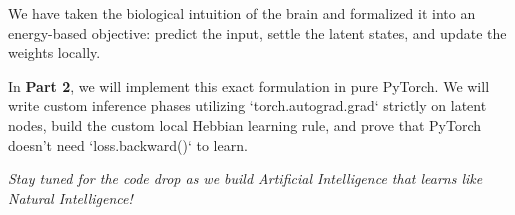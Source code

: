 \documentclass[12pt]{article}
\begin{document}
We have taken the biological intuition of the brain and formalized it into an energy-based objective: predict the input, settle the latent states, and update the weights locally.

In \textbf{Part 2}, we will implement this exact formulation in pure PyTorch. We will write custom inference phases utilizing `torch.autograd.grad` strictly on latent nodes, build the custom local Hebbian learning rule, and prove that PyTorch doesn't need `loss.backward()` to learn.

\vspace{1em}
\noindent \textit{Stay tuned for the code drop as we build Artificial Intelligence that learns like Natural Intelligence!}
\end{document}
